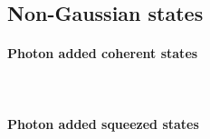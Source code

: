     \subsection{Non-Gaussian states}

    \paragraph{Photon added coherent states}\mbox{} \\

    \paragraph{Photon added squeezed states}\mbox{} \\